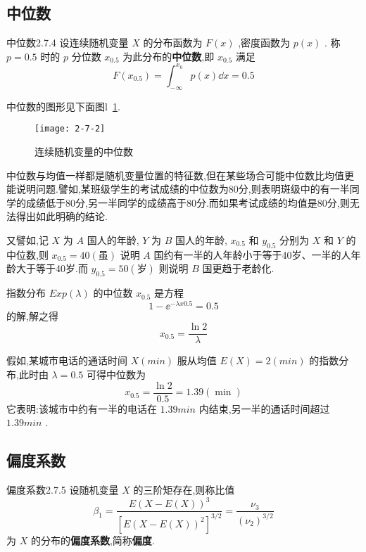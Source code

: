 \subsection{中位数}\label{ssec:2.7.4}

\begin{definition}{中位数}{2.7.4}
	设连续随机变量 $ X $ 的分布函数为 $ F(x) $ ,密度函数为 $ p(x) $ .
	称 $ p=0.5 $ 时的 $ p $ 分位数 $ x_{0.5} $ 为此分布的\textbf{中位数},即 $ x_{0.5} $ 满足
	\begin{equation}
	F\left(x_{0.5}\right)=\int_{-\infty}^{x_{0}} p(x) \dd x=0.5 \label{eq:2.7.8}
	\end{equation}
	
\end{definition}

中位数的图形见下面图l~\ref{fig:2.7.2}.

\begin{figure}
	\centering
	\texttt{[image: 2-7-2]}
	\caption{连续随机变量的中位数}
	\label{fig:2.7.2}
\end{figure}

中位数与均值一样都是随机变量位置的特征数,但在某些场合可能中位数比均值更能说明问题.譬如,某班级学生的考试成绩的中位数为80分,则表明斑级中的有一半同学的成绩低于80分,另一半同学的成绩高于80分.而如果考试成绩的均值是80分,则无法得出如此明确的结论.

又譬如,记 $ X $ 为 $ A $ 国人的年龄, $ Y $ 为 $ B $ 国人的年龄, $ x_{0.5} $ 和 $ y_{0.5} $ 分别为 $ X $ 和 $ Y $ 的中位数,则 $ x_{0.5}=40(\text{虽}) $ 说明 $ A $ 国约有一半的人年龄小于等于40岁、一半的人年龄大于等于40岁.而 $ y_{0.5}=50(\text{岁}) $ 则说明 $ B $ 国更趋于老龄化.

\begin{example}\label{exam:2.7.4}
	指数分布 $ E x p(\lambda) $ 的中位数 $ x_{0.5} $ 是方程
	\[
	1-\ee ^{-\lambda x 0.5}=0.5
	\]
	的解,解之得
	\[
	x_{0.5}=\frac{\ln 2}{\lambda}
	\]
	
	假如,某城市电话的通话时间 $ X(min) $ 服从均值 $ E(X)=2(min) $ 的指数分布,此时由 $ \lambda=0.5 $ 可得中位数为
	\[
	x_{0.5}=\frac{\ln 2}{0.5}=1.39(\min )
	\]
	它表明:该城市中约有一半的电话在 $ 1.39min $ 内结束,另一半的通话时间超过 $ 1.39 min $ .
\end{example}

\subsection{偏度系数}\label{ssec:2.7.5}

\begin{definition}{偏度系数}{2.7.5}
	设随机变量 $ X $ 的三阶矩存在,则称比值
	\begin{equation}
	\beta_{1}=\frac{E(X-E(X))^{3}}{\left[E(X-E(X))^{2}\right]^{3 / 2}}=\frac{\nu_{3}}{\left(\nu_{2}\right)^{3 / 2}} \label{eq:2.7.9}
	\end{equation}
	为 $ X $ 的分布的\textbf{偏度系数},简称\textbf{偏度}.
	
\end{definition}

